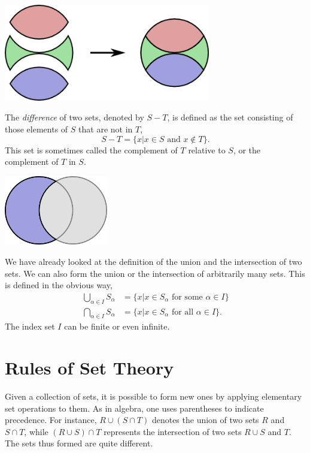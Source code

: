 \begin{center}
\includegraphics[height=4.23cm]{Figures/1Chapter/setpartition}
\end{center}

The \emph{difference} of two sets, denoted by $S - T$, is defined as the set consisting of those elements of $S$ that are not in $T$,
\begin{equation*}
S - T = \{ x | x \in S \text{ and } x \notin T \} .
\end{equation*}
This set is sometimes called the complement of $T$ relative to $S$, or the complement of $T$ in $S$.

\begin{center}
\includegraphics[height=3.03cm]{Figures/1Chapter/difference}
\end{center}

We have already looked at the definition of the union and the intersection of two sets.
We can also form the union or the intersection of arbitrarily many sets.
This is defined in the obvious way,
\begin{align*}
\bigcup_{\alpha \in I} S_{\alpha}
&= \{ x | x \in S_{\alpha} \text{ for some } \alpha \in I \} \\
\bigcap_{\alpha \in I} S_{\alpha}
&= \{ x | x \in S_{\alpha} \text{ for all } \alpha \in I \} .
\end{align*}
The index set $I$ can be finite or even infinite.


\section{Rules of Set Theory}

Given a collection of sets, it is possible to form new ones by applying elementary set operations to them.
As in algebra, one uses parentheses to indicate precedence.
For instance, $R \cup (S \cap T)$ denotes the union of two sets $R$ and $S \cap T$, while $(R \cup S) \cap T$ represents the intersection of two sets $R \cup S$ and $T$.
The sets thus formed are quite different.

